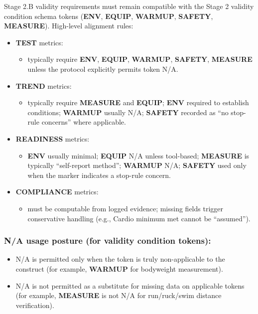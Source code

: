 \documentclass[10pt]{article}
\begin{document}
Stage 2.B validity requirements must remain compatible with the Stage 2 validity condition schema tokens (\textbf{ENV}, \textbf{EQUIP}, \textbf{WARMUP}, \textbf{SAFETY}, \textbf{MEASURE}). High-level alignment rules:

\begin{itemize}
\item \textbf{TEST} metrics:
  \begin{itemize}
  \item typically require \textbf{ENV}, \textbf{EQUIP}, \textbf{WARMUP}, \textbf{SAFETY}, \textbf{MEASURE} unless the protocol explicitly permits token N/A.
  \end{itemize}
\item \textbf{TREND} metrics:
  \begin{itemize}
  \item typically require \textbf{MEASURE} and \textbf{EQUIP}; \textbf{ENV} required to establish conditions; \textbf{WARMUP} usually N/A; \textbf{SAFETY} recorded as “no stop-rule concerns” where applicable.
  \end{itemize}
\item \textbf{READINESS} metrics:
  \begin{itemize}
  \item \textbf{ENV} usually minimal; \textbf{EQUIP} N/A unless tool-based; \textbf{MEASURE} is typically “self-report method”; \textbf{WARMUP} N/A; \textbf{SAFETY} used only when the marker indicates a stop-rule concern.
  \end{itemize}
\item \textbf{COMPLIANCE} metrics:
  \begin{itemize}
  \item must be computable from logged evidence; missing fields trigger conservative handling (e.g., Cardio minimum met cannot be “assumed”).
  \end{itemize}
\end{itemize}

\subsubsection*{N/A usage posture (for validity condition tokens):}

\begin{itemize}
\item N/A is permitted only when the token is truly non-applicable to the construct (for example, \textbf{WARMUP} for bodyweight measurement).
\item N/A is not permitted as a substitute for missing data on applicable tokens (for example, \textbf{MEASURE} is not N/A for run/ruck/swim distance verification).
\end{itemize}
\end{document}

